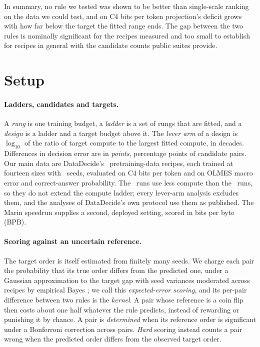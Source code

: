 \documentclass{article}
\begin{document}
In summary, no rule we tested was shown to be better than single-scale
ranking on the data we could test, and on C4 bits per token projection's deficit
grows with how far below the target the fitted range ends. The gap between the two rules is nominally significant for
the recipes measured and too small to establish for recipes in general with the
candidate counts public suites provide.

\section{Setup}
\label{sec:setup}

\paragraph{Ladders, candidates and targets.} A \emph{rung} is one training
budget, a \emph{ladder} is a set of rungs that are fitted, and a \emph{design}
is a ladder and a target budget above it. The \emph{lever arm} of a design is
$\log_{10}$ of the ratio of target compute to the largest fitted compute, in  %
decades. Differences in decision error are in \emph{points}, percentage points
of candidate pairs. Our main data are DataDecide's
\citep{magnusson2025datadecide} \nCandidates\ pretraining-data recipes, each
trained at fourteen sizes with \ddSeeds\ seeds, evaluated on C4 bits per token  %
and on OLMES macro error and correct-answer probability. The \ddFindingScale\
runs use less compute than the \primaryTarget\ runs, so they do not extend the
compute ladder; every lever-arm analysis excludes them, and the analyses of
DataDecide's own protocol use them as published. The Marin speedrun
\citep{marin2025speedrun} supplies a second, deployed setting, scored in bits
per byte (BPB).

\paragraph{Scoring against an uncertain reference.} The target order is itself
estimated from finitely many seeds. We charge each pair the probability that
its true order differs from the predicted one, under a Gaussian approximation
to the target gap with seed variances moderated across recipes by empirical
Bayes \citep{smyth2004linear}; we call this \emph{expected-error scoring}, and
its per-pair difference between two rules is the \emph{kernel}. A pair whose
reference is a coin flip then costs about one half whatever the rule predicts,
instead of rewarding or punishing it by chance. A pair is \emph{determined}
when its reference order is significant under a Bonferroni correction across
pairs. \emph{Hard} scoring instead counts a pair wrong when the predicted order
differs from the observed target order.
\end{document}

